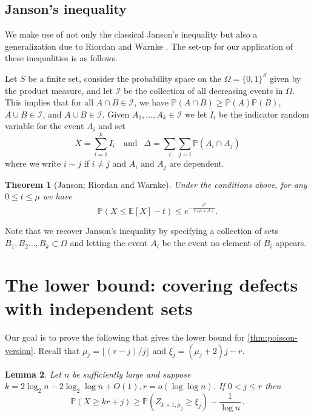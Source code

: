 \documentclass[11pt]{article}
\newtheorem{theorem}{Theorem}
\newtheorem{lemma}[theorem]{Lemma}
\theoremstyle{definition}
\theoremstyle{remark}
\newcommand{\EE}{\mathbb{E}}
\newcommand{\PP}{\mathbb{P}}
\newcommand{\cI}{\mathcal{I}}
\begin{document}
\subsection{Janson's inequality}
We make use of not only the classical Janson's inequality but also a
generalization due to Riordan and Warnke \cite{riordan2015janson}. The set-up for our application
of these inequalities is as follows.

Let $S$ be a finite set, consider the probability space on
the $ \Omega = \{0,1\}^S$ given by the product measure, and let $ \cI$ be
the collection of all decreasing events in $ \Omega$. This implies that for all $A \cap B \in \mathcal{I}$, we have $\PP(A \cap B) \geq \PP(A)\PP(B)$, $A\cup B \in \mathcal{I}$, and $A\cup B \in \mathcal{I}$.  Given 
$A_1, \dots, A_k \in \cI$ we let $ I_i$ be the indicator random variable
for the event $A_i$ and set
\[ X = \sum_{i=1}^k I_i \ \ \ \text{ and } \ \ 
\Delta = \sum_{i}\sum_{j \sim i} \PP( A_i \cap A_j)\]
where we write $ i \sim j$ if $ i\neq j$ and $A_i$ and $ A_j$ are dependent.

\begin{theorem}[Janson; Riordan and Warnke] \label{thm:janson}
Under the conditions above, for any $0 \le t \le \mu$ we have
\[ \PP(X \le \EE[X] - t ) \le e^{- \frac{ t^2}{  2(\mu+  \Delta)}}.\]
\end{theorem}
\noindent Note that we recover Janson's inequality by specifying a collection of sets $ B_1, B_2 \dots, B_k \subset \Omega$ and letting the event $A_i$ be the event no element of $B_i$ appears.




\section{The lower bound: covering defects with independent sets} \label{sec:LB}


Our goal is to prove  the following that gives the lower bound for \cref{thm:poisson-version}. Recall that $\mu_j = \lfloor (r-j)/j \rfloor$ and $ \xi_j = (\mu_j +2)j - r$. 
\begin{lemma}\label{lem:new-lower}
    Let $n$ be sufficiently large and suppose $k = 2\log_2 n - 2 \log_2 \log n + O(1), r = o(\log\log n)$.  
    If $ 0 < j \le r$ 
    then $$\PP(X \geq kr + j) \geq \PP(Z_{k+1,\mu_{j}} \geq \xi_j) - \frac{1}{\log n} \,.$$
\end{lemma}
\end{document}
